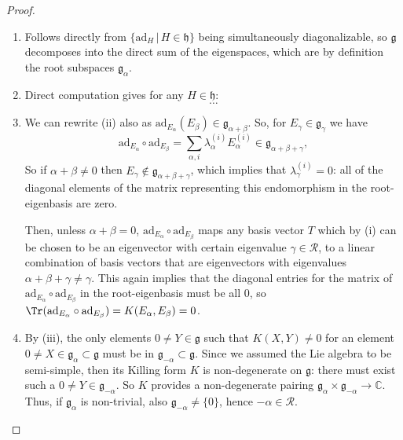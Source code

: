\begin{proof}
    \begin{enumerate}[label=(\roman*)]
        \item Follows directly from \(\{\mathrm{ad}_H \,|\, H \in \mathfrak{h}\}\) being simultaneously diagonalizable, so \(\mathfrak{g}\) decomposes into the direct sum of the eigenspaces, which are by definition the root subspaces \(\mathfrak{g}_{\alpha}\).
        \item Direct computation gives for any \(H \in \mathfrak{h}\):
              \[
                  \dots
              \]
        \item We can rewrite (ii) also as \(\mathrm{ad}_{E_{\alpha}} (E_{\beta}) \in \mathfrak{g}_{\alpha + \beta}\). So, for \(E_{\gamma} \in \mathfrak{g}_{\gamma}\) we have
              \[
                  \mathrm{ad}_{E_{\alpha}} \circ \mathrm{ad}_{E_{\beta}} = \sum_{\alpha, i} \lambda_{\alpha}^{(i)} E_\alpha^{(i)} \in \mathfrak{g}_{\alpha + \beta + \gamma},
              \]
              So if \(\alpha + \beta \neq 0\) then \(E_{\gamma} \notin \mathfrak{g}_{\alpha + \beta + \gamma}\), which implies that \(\lambda_{\gamma}^{(i)} = 0\): all of the diagonal elements of the matrix representing this endomorphism in the root-eigenbasis are zero.

              Then, unless \(\alpha + \beta = 0\), \(\mathrm{ad}_{E_{\alpha}} \circ \mathrm{ad}_{E_{\beta}} \) maps any basis vector \(T\) which by (i) can be chosen to be an eigenvector with certain eigenvalue \(\gamma \in \mathcal{R}\), to a linear combination of basis vectors that are eigenvectors with eigenvalues \(\alpha + \beta + \gamma \neq \gamma\). This again implies that the diagonal entries for the matrix of \(\mathrm{ad}_{E_{\alpha}} \circ \mathrm{ad}_{E_{\beta}} \) in the root-eigenbasis must be all 0, so \(\Tr(\mathrm{ad}_{E_{\alpha}} \circ \mathrm{ad}_{E_{\beta}}) = K(E_{\alpha}, E_{\beta}) = 0\).
        \item By (iii), the only elements \(0 \neq Y \in \mathfrak{g}\) such that \(K(X, Y) \neq 0\) for an element \(0 \neq X \in \mathfrak{g}_\alpha \subset \mathfrak{g}\) must be in \(\mathfrak{g}_{-\alpha} \subset \mathfrak{g}\). Since we assumed the Lie algebra to be semi-simple, then its Killing form \(K\) is non-degenerate on \(\mathfrak{g}\): there must exist such a \(0 \neq Y \in \mathfrak{g}_{-\alpha}\). So \(K\) provides a non-degenerate pairing \(\mathfrak{g}_\alpha \times \mathfrak{g}_{-\alpha} \to \mathbb{C}\). Thus, if \(\mathfrak{g}_\alpha\) is non-trivial, also \(\mathfrak{g}_{-\alpha} \neq \{0\}\), hence \(-\alpha \in \mathcal{R}\).
    \end{enumerate}
\end{proof}

